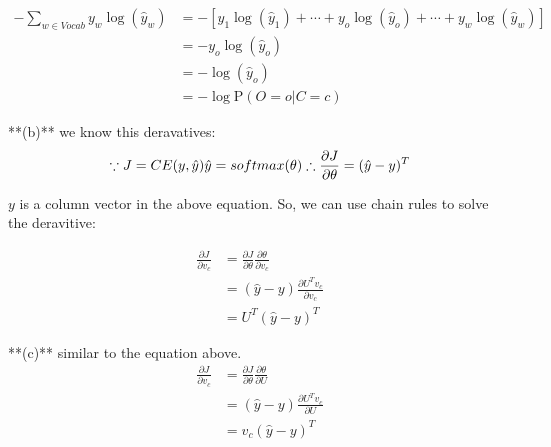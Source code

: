 \documentclass[10pt]{article}
\newenvironment{problem}[2][Problem]{\begin{trivlist}
\item[\hskip \labelsep {\bfseries #1}\hskip \labelsep {\bfseries #2.}]}{\end{trivlist}}
\begin{document}
\begin{problem}{4}
$\begin{aligned}
    - \sum_{w\in Vocab}y_w\log(\hat{y}_w) &= - [y_1\log(\hat{y}_1) + \cdots + y_o\log(\hat{y}_o) + \cdots + y_w\log(\hat{y}_w)] \\
    & = - y_o\log(\hat{y}_o) \\
    & = -\log(\hat{y}_o) \\
    & = -\log \mathrm{P}(O = o | C = c)
\end{aligned}$

**(b)** we know this deravatives:
$$
\because J = CE(y, \hat{y}) \\
\hat{y} = softmax(\theta)\\
\therefore \frac{\partial J}{\partial \theta} = (\hat{y} - y)^T
$$

$y$ is a column vector in the above equation. So, we can use chain rules to solve the deravitive:

$$\begin{aligned}
\frac{\partial J}{\partial v_c} &= \frac{\partial J}{\partial \theta} \frac{\partial \theta}{\partial v_c} \\
&= (\hat{y} - y) \frac{\partial U^Tv_c}{\partial v_c} \\
&= U^T(\hat{y} - y)^T
\end{aligned}$$

**(c)**
similar to the equation above.
$$\begin{aligned}
\frac{\partial J}{\partial v_c} &= \frac{\partial J}{\partial \theta} \frac{\partial \theta}{\partial U} \\
&= (\hat{y} - y) \frac{\partial U^Tv_c}{\partial U} \\
&= v_c(\hat{y} - y)^T
\end{aligned}$$
\end{problem}
\end{document}
